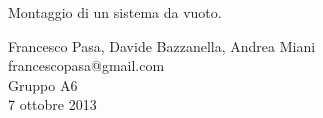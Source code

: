 \begin{center}

	\vspace{0.5cm}
     	{\huge Montaggio di un sistema da vuoto.}
	\vspace{0.5cm}

      	{\large Francesco Pasa, Davide Bazzanella, Andrea Miani} \\
      	{francescopasa@gmail.com} \\
		{\large Gruppo A6} \\
	
	\vspace{0.3cm}
      	{\large 7 ottobre 2013}
    
    \vspace{0.7cm}

\end{center}

